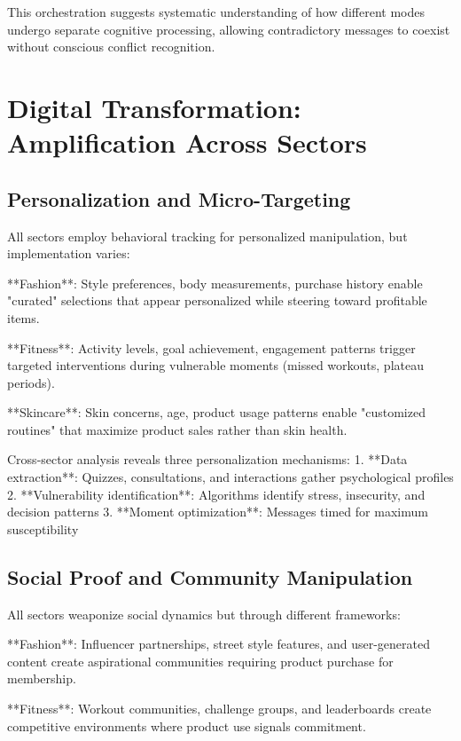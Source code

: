 This orchestration suggests systematic understanding of how different modes undergo separate cognitive processing, allowing contradictory messages to coexist without conscious conflict recognition.

\section{Digital Transformation: Amplification Across Sectors}
\label{sec:digital_patterns}

\subsection{Personalization and Micro-Targeting}

All sectors employ behavioral tracking for personalized manipulation, but implementation varies:

**Fashion**: Style preferences, body measurements, purchase history enable "curated" selections that appear personalized while steering toward profitable items.

**Fitness**: Activity levels, goal achievement, engagement patterns trigger targeted interventions during vulnerable moments (missed workouts, plateau periods).

**Skincare**: Skin concerns, age, product usage patterns enable "customized routines" that maximize product sales rather than skin health.

Cross-sector analysis reveals three personalization mechanisms:
1. **Data extraction**: Quizzes, consultations, and interactions gather psychological profiles
2. **Vulnerability identification**: Algorithms identify stress, insecurity, and decision patterns
3. **Moment optimization**: Messages timed for maximum susceptibility

\subsection{Social Proof and Community Manipulation}

All sectors weaponize social dynamics but through different frameworks:

**Fashion**: Influencer partnerships, street style features, and user-generated content create aspirational communities requiring product purchase for membership.

**Fitness**: Workout communities, challenge groups, and leaderboards create competitive environments where product use signals commitment.

